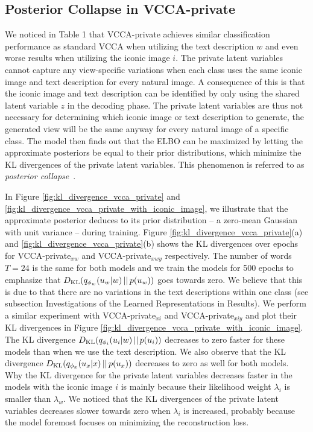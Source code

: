 \subsection*{Posterior Collapse in VCCA-private}
\label{paperB:app:posterior_collapse_in_vcca_private}

We noticed in Table 1 that VCCA-private achieves similar classification performance as standard VCCA when utilizing the text description $w$ and even worse results when utilizing the iconic image $i$. The private latent variables cannot capture any view-specific variations when each class uses the same iconic image and text description for every natural image. 
A consequence of this is that the iconic image and text description can be identified by only using the shared latent variable $z$ in the decoding phase. The private latent variables are thus not necessary for determining which iconic image or text description to generate, the generated view will be the same anyway for every natural image of a specific class. The model then finds out that the ELBO can be maximized by letting the approximate posteriors be equal to their prior distributions, which minimize the KL divergences of the private latent variables. This phenomenon is referred to as \textit{posterior collapse}~. 

In Figure \ref{fig:kl_divergence_vcca_private} and \ref{fig:kl_divergence_vcca_private_with_iconic_image}, we illustrate that the approximate posterior deduces to its prior distribution -- a zero-mean Gaussian with unit variance -- during training. Figure \ref{fig:kl_divergence_vcca_private}(a) and \ref{fig:kl_divergence_vcca_private}(b) shows the KL divergences over epochs for VCCA-private$_{x w}$ and VCCA-private$_{x w y}$ respectively. The number of words $T=24$ is the same for both models and we train the models for 500 epochs to emphasize that $D_{\mathrm{KL}}(q_{\phi_{w}}(u_{w} |w)\,||\,p(u_{w}))$ goes towards zero. We believe that this is due to that there are no variations in the text descriptions within one class (see subsection Investigations of the Learned Representations in Results). We perform a similar experiment with VCCA-private$_{x i}$ and VCCA-private$_{x i y}$ and plot their KL divergences in Figure \ref{fig:kl_divergence_vcca_private_with_iconic_image}. The KL divergence $D_{\mathrm{KL}}(q_{\phi_{i}}(u_{i} |w)\,||\,p(u_{i}))$ decreases to zero faster for these models than when we use the text description. We also observe that the KL divergence $D_{\mathrm{KL}}(q_{\phi_{x}}(u_{x} |x)\,||\,p(u_{x}))$ decreases to zero as well for both models. Why the KL divergence for the private latent variables decreases faster in the models with the iconic image $i$ is mainly because their likelihood weight $\lambda_{i}$ is smaller than $\lambda_{w}$. We noticed that the KL divergences of the private latent variables decreases slower towards zero when $\lambda_{i}$ is increased, probably because the model foremost focuses on minimizing the reconstruction loss. 

